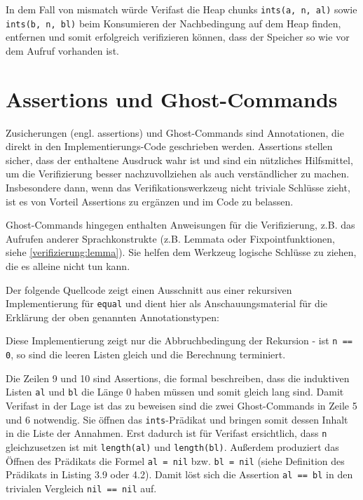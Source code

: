 In dem Fall von mismatch würde Verifast die Heap chunks \lstinline{ints(a, n, al)} sowie
\lstinline{ints(b, n, bl)} beim Konsumieren der Nachbedingung auf dem Heap finden, entfernen und
somit erfolgreich verifizieren können, dass der Speicher so wie vor dem Aufruf vorhanden ist.



\section{Assertions und Ghost-Commands}

Zusicherungen (engl. assertions) und Ghost-Commands sind Annotationen, die direkt in den Implementierungs-Code
geschrieben werden. Assertions stellen sicher, dass der enthaltene Ausdruck wahr ist und sind ein nützliches Hilfsmittel, 
um die Verifizierung besser nachzuvollziehen als auch verständlicher zu machen. Insbesondere dann, wenn das Verifikationswerkzeug 
nicht triviale Schlüsse zieht, ist es von Vorteil Assertions zu ergänzen und im Code zu belassen.

Ghost-Commands hingegen enthalten Anweisungen für die Verifizierung, z.B. das Aufrufen anderer Sprachkonstrukte 
(z.B. Lemmata oder Fixpointfunktionen, siehe \ref{verifizierung:lemma}). Sie helfen dem Werkzeug logische Schlüsse 
zu ziehen, die es alleine nicht tun kann.

Der folgende Quellcode zeigt einen Ausschnitt aus einer rekursiven Implementierung für \lstinline{equal} und dient
hier als Anschauungsmaterial für die Erklärung der oben genannten Annotationstypen:



Diese Implementierung zeigt nur die Abbruchbedingung der Rekursion - ist \lstinline{n == 0}, so sind die
leeren Listen gleich und die Berechnung terminiert. 

Die Zeilen 9 und 10 sind Assertions, die formal beschreiben, dass die induktiven Listen \lstinline{al} und
\lstinline{bl} die Länge 0 haben müssen und somit gleich lang sind. Damit Verifast in der Lage ist das zu
beweisen sind die zwei Ghost-Commands in Zeile 5 und 6 notwendig. Sie öffnen das \lstinline{ints}-Prädikat
und bringen somit dessen Inhalt in die Liste der Annahmen. Erst dadurch ist für Verifast ersichtlich, dass 
\lstinline{n} gleichzusetzen ist mit \texttt{length(al)} und \texttt{length(bl)}. Außerdem produziert
das Öffnen des Prädikats die Formel \lstinline{al = nil} bzw. \lstinline{bl = nil} (siehe Definition
des Prädikats in Listing 3.9 oder 4.2). Damit löst sich die Assertion \lstinline{al == bl} in den
trivialen Vergleich \lstinline{nil == nil} auf.

